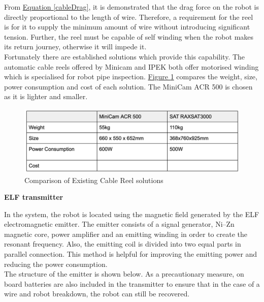 \documentclass[11pt]{article}		%
\begin{document}
        From \hyperref[cableDrag]{Equation \ref*{cableDrag}}, it is demonstrated that the drag force on the robot is directly proportional to the length of wire. 
        Therefore, a requirement for the reel is for it to supply the minimum amount of wire without introducing significant tension. 
        Further, the reel must be capable of self winding when the robot makes its return journey, otherwise it will impede it.
        \\ 
        \hspace*{3ex}Fortunately there are established solutions which provide this capability. 
        The automatic cable reels offered by Minicam and IPEK both offer motorised winding which is specialised for robot pipe inspection. 
        \hyperref[comparisonReels]{Figure \ref*{comparisonReels}} compares the weight, size, power consumption and cost of each solution. 
        The MiniCam ACR 500 is chosen as it is lighter and smaller. 

        
        \begin{figure}[h]
			\centering
			\includegraphics[scale=1]{cablereel.png}
			\caption{Comparison of Existing Cable Reel solutions}
			\label{comparisonReels}
		\end{figure}
        
        \textbf{ELF transmitter}
        
        In the system, the robot is located using the magnetic field generated by the ELF electromagnetic emitter. 
        The emitter consists of a signal generator, Ni–Zn magnetic core, power amplifier and an emitting winding in order to create the resonant frequency. 
        Also, the emitting coil is divided into two equal parts in parallel connection. 
        This method is helpful for improving the emitting power and reducing the power consumption. 
        \\
        \hspace*{3ex}The structure of the emitter is shown below. 
        As a precautionary measure, on board batteries are also included in the transmitter to ensure that in the case of a wire and robot breakdown, the robot can still be recovered. 
                
\end{document}
